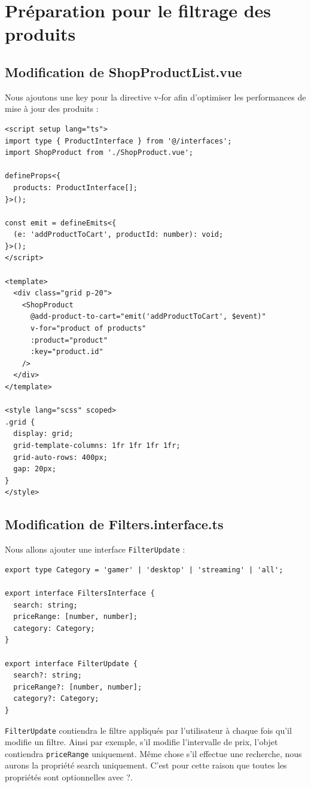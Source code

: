 
\section{Préparation pour le filtrage des produits}
\subsection{Modification de ShopProductList.vue}
Nous ajoutons une {\color{monOrange}key} pour la directive {\color{monOrange}v-for} afin d'optimiser les performances de mise à jour des produits :
\begin{verbatim}
<script setup lang="ts">
import type { ProductInterface } from '@/interfaces';
import ShopProduct from './ShopProduct.vue';

defineProps<{
  products: ProductInterface[];
}>();

const emit = defineEmits<{
  (e: 'addProductToCart', productId: number): void;
}>();
</script>

<template>
  <div class="grid p-20">
    <ShopProduct
      @add-product-to-cart="emit('addProductToCart', $event)"
      v-for="product of products"
      :product="product"
      :key="product.id"
    />
  </div>
</template>

<style lang="scss" scoped>
.grid {
  display: grid;
  grid-template-columns: 1fr 1fr 1fr 1fr;
  grid-auto-rows: 400px;
  gap: 20px;
}
</style>
\end{verbatim}
\subsection{Modification de Filters.interface.ts}
Nous allons ajouter une interface {\tt FilterUpdate} :
\begin{verbatim}
export type Category = 'gamer' | 'desktop' | 'streaming' | 'all';

export interface FiltersInterface {
  search: string;
  priceRange: [number, number];
  category: Category;
}

export interface FilterUpdate {
  search?: string;
  priceRange?: [number, number];
  category?: Category;
}
\end{verbatim}
{\tt FilterUpdate} contiendra le filtre appliqués par l'utilisateur à chaque fois qu'il modifie un filtre. Ainsi par exemple, s'il modifie l'intervalle de prix, l'objet contiendra {\tt priceRange} uniquement. Même chose s'il effectue une recherche, nous aurons la propriété {\color{monOrange}search} uniquement. C'est pour cette raison que toutes les propriétés sont optionnelles avec {\color{monOrange}?}.

